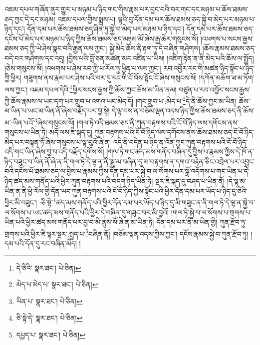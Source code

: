 འཇམ་དཔལ་གཞོན་ནུར་གྱུར་པ་མཉམ་པ་ཉིད་གང་གིས་རྣམ་པར་བྱང་བའི་བར་གང་དང་མཉམ་པ་ཆོས་ཐམས་ཅད་ཀྱང་དེ་དང་མཉམ། འཇམ་དཔལ་གྱིས་སྨྲས་པ། ལྷའི་བུ་དོན་དམ་པར་ཆོས་ཐམས་ཅད་སྐྱེ་བ་མེད་པར་མཉམ་པ་ཉིད་དང་། དོན་དམ་པར་ཆོས་ཐམས་ཅད་ཤིན་ཏུ་སྐྱེ་བ་མེད་པར་མཉམ་པ་ཉིད་དང་། དོན་དམ་པར་ཆོས་ཐམས་ཅད་དངོས་པོ་མེད་པར་མཉམ་པ་ཉིད་ཀྱིས་ཆོས་ཐམས་ཅད་མཉམ་མོ་ཞེས་རྒྱ་ཆེར་གསུངས་སོ། །འཕགས་པ་སངས་རྒྱས་ཐམས་ཅད་ཀྱི་ཡེ་ཤེས་སྣང་བའི་རྒྱན་ལས་ཀྱང་། སྐྱེ་མེད་ཆོས་ནི་རྟག་ཏུ་དེ་བཞིན་གཤེགས། །ཆོས་རྣམས་ཐམས་ཅད་བདེ་བར་གཤེགས་དང་འདྲ། །བྱིས་པའི་བློ་ཅན་མཚན་མར་འཛིན་པ་ཡིས། །འཇིག་རྟེན་ན་ནི་མེད་པའི་ཆོས་ལ་སྤྱོད། །ཅེས་གསུངས་སོ། །འཕགས་པ་ཤེས་རབ་ཀྱི་ཕ་རོལ་ཏུ་ཕྱིན་པ་ལས་ཀྱང་། རབ་འབྱོར་རང་གི་མཚན་ཉིད་སྟོང་པ་ཉིད་ཀྱི་ཕྱིར། གཟུགས་ནས་རྣམ་པར་ཤེས་པའི་བར་དུ་རང་གི་ངོ་བོས་སྟོང་ངོ་ཞེས་གསུངས་སོ། །དཀོན་མཆོག་ཟ་མ་ཏོག་ལས་ཀྱང་། འཇམ་དཔལ་དེའི་\footnote{དེ་ཅིའི་  སྣར་ཐང་།  པེ་ཅིན། }ཕྱིར་སངས་རྒྱས་ཀྱི་ཆོས་ཀྱང་ཆོས་མ་ཡིན་ནམ། བཙུན་པ་རབ་འབྱོར་སངས་རྒྱས་ཀྱི་ཆོས་རྣམས་ལ་ཡང་དག་པར་གྲུབ་པ་འགའ་ཡང་མེད་དོ། །གང་གྲུབ་པ་:མེད་པ་\footnote{མེད་པ་མེད་པ་  སྣར་ཐང་།  པེ་ཅིན། }དེ་ནི་ཆོས་ཀྱང་མ་ཡིན། ཆོས་མ་ཡིན་པ་ཡང་མ་ཡིན་ནོ་ཞེས་བརྗོད་པར་བྱ་སྟེ། དེ་ལྟ་བས་ན་བཅོམ་ལྡན་འདས་ཉིད་ཀྱིས་ཆོས་ཐམས་ཅད་ནི་ཆོས་མ་:ཡིན་པའོ་\footnote{ཡིན་པ་  སྣར་ཐང་།  པེ་ཅིན། }ཞེས་གསུངས་སོ། །གལ་ཏེ་འདི་ཐམས་ཅད་ནི་ཀུན་བརྟགས་པའི་ངོ་བོ་ཉིད་ལས་དགོངས་ནས་གསུངས་པ་ཡིན་ཏེ། མདོ་ལས་ཇི་སྐད་དུ། ཀུན་བརྟགས་པའི་ངོ་བོ་ཉིད་ལས་དགོངས་ནས་ཆོས་ཐམས་ཅད་ངོ་བོ་ཉིད་མེད་པར་བསྟན་ཏོ་ཞེས་གསུངས་པ་ལྟ་བུའོ་ཞེ་ན། འདི་ནི་བདེན་པ་ཉིད་ན་འོན་ཀྱང་ཀུན་བརྟགས་པའི་ངོ་བོ་ཉིད་འདི་གང་ཡིན་ཞེས་བྱ་བ་འདི་བརྗོད་དགོས་སོ། །གལ་ཏེ་གང་ཚད་མས་གནོད་བཞིན་དུ་བྱིས་པ་རྣམས་ཀྱིས་དེ་ཁོ་ན་ཉིད་བཟུང་བ་ཡིན་ནོ་ཞེ་ན་ནི་གལ་ཏེ་དེ་ལྟ་ན་ནི་སྒྱུ་མ་བཞིན་དུ་མ་བརྟགས་ན་དགའ་བརྟེན་ཅིང་འབྲེལ་པར་འབྱུང་བའི་དངོས་པོ་ཐམས་ཅད་ལ་བྱིས་པ་རྣམས་ཀྱིས་དོན་དམ་པར་སྐྱེ་བ་ལ་སོགས་པར་སྒྲོ་འདོགས་པ་གང་ཡིན་པ་དེ་ཉིད་ཚད་མས་གནོད་པའི་ཕྱིར་ཀུན་བརྟགས་པའི་བདག་ཉིད་ཡིན་ཏེ། སྔར་ཇི་སྐད་དུ་བཤད་པ་ཡིན་ནོ། །དེ་ལྟ་མ་ཡིན་ན་ནི་ཕྱི་རོལ་གྱི་དོན་ཡང་ཀུན་བརྟགས་པའི་ངོ་བོ་ཉིད་ཀྱིས་སྟོང་པའི་ཕྱིར་དོན་དམ་པར་ཡོད་པ་ཉིད་དུ་ཅིའི་ཕྱིར་མི་བཟུང་། :ཅི་སྟེ་\footnote{ཅི་སྟེ་དེ་  སྣར་ཐང་།  པེ་ཅིན། }ཚད་མས་གནོད་པའི་ཕྱིར་དོན་དམ་པར་ཡོད་པ་ཉིད་དུ་མི་གཟུང་ན་ནི་གལ་ཏེ་དེ་ལྟ་ན་སྐྱེ་བ་ལ་སོགས་པ་ཡང་ཚད་མས་གནོད་པའི་ཕྱིར་དེ་བཞིན་དུ་གཟུང་བར་མི་བྱའོ། །གལ་ཏེ་སྐྱེ་བ་ལ་སོགས་པ་གྲགས་པ་ཡིན་པའི་ཕྱིར་ཚད་མས་གནོད་པར་བྱ་བ་མི་ནུས་སོ་ཞེ་ན་མ་ཡིན་ཏེ། དོན་དམ་པར་ནི་མ་ཡིན་གྱི། ཀུན་རྫོབ་ཏུ་གྲགས་པའི་ཕྱིར་ཇི་ལྟར་སྔར་:སྤྱད་པ་\footnote{དཔྱད་པ་  སྣར་ཐང་།  པེ་ཅིན། }བཞིན་ནོ། །བཅོམ་ལྡན་འདས་ཀྱིས་ཀྱང་། དངོས་རྣམས་སྐྱེ་བ་ཀུན་རྫོབ་ཏུ། །དམ་པའི་དོན་དུ་རང་བཞིན་མེད། །
